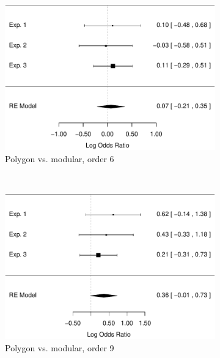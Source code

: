 \documentclass[man,10pt]{apa6}
\begin{document}
\begin{figure}
\centering
\begin{subfigure}[c]{0.4\textwidth}
\centering
\includegraphics[width=\textwidth]{figures/meta/question_typegenerator_false_6_conditionpolygon.pdf}
\caption{Polygon vs. modular, order 6}
\end{subfigure}
~
\begin{subfigure}[c]{0.4\textwidth}
\centering
\includegraphics[width=\textwidth]{figures/meta/question_typegenerator_false_9_conditionpolygon.pdf}
\caption{Polygon vs. modular, order 9}
\end{subfigure} \\
\centering
\begin{subfigure}[c]{0.4\textwidth}
\centering

\end{subfigure}
\end{figure}
\end{document}
